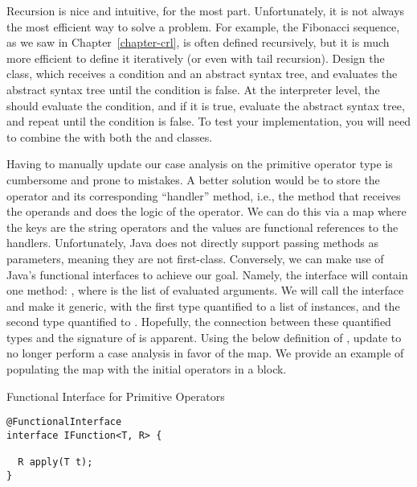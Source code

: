  Recursion is nice and intuitive, for the most part. Unfortunately, it is not always the most efficient way to solve a problem. For example, the Fibonacci sequence, as we saw in Chapter~\ref{chapter-crl}, is often defined recursively, but it is much more efficient to define it iteratively (or even with tail recursion). Design the  class, which receives a condition and an abstract syntax tree, and evaluates the abstract syntax tree until the condition is false. At the interpreter level, the  should evaluate the condition, and if it is true, evaluate the abstract syntax tree, and repeat until the condition is false. To test your implementation, you will need to combine the  with both the  and  classes.

 Having to manually update our case analysis on the primitive operator type is cumbersome and prone to mistakes. A better solution would be to store the operator and its corresponding ``handler'' method, i.e., the method that receives the operands and does the logic of the operator. We can do this via a map where the keys are the string operators and the values are functional references to the handlers. Unfortunately, Java does not directly support passing methods as parameters, meaning they are not first-class. Conversely, we can make use of Java's functional interfaces to achieve our goal. Namely, the interface will contain one method: , where  is the list of evaluated arguments. We will call the interface  and make it generic, with the first type quantified to a list of  instances, and the second type quantified to . Hopefully, the connection between these quantified types and the signature of  is apparent. Using the below definition of , update  to no longer perform a case analysis in favor of the map. We provide an example of populating the map with the initial operators in a  block.

\begin{cl}[]{Functional Interface for Primitive Operators}
\begin{lstlisting}[language=MyJava]
@FunctionalInterface
interface IFunction<T, R> {
  
  R apply(T t);
}
\end{lstlisting}
\end{cl}

